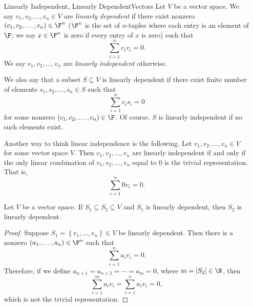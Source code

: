 \documentclass[linearalgebraI]{subfiles}
\begin{document}
    \begin{definition}{Linearly Independent, Linearly Dependent}{Vectors}
        Let $V$ be a vector space. We say $v_1,v_2,\ldots,v_n\in V$ are \emph{linearly dependent} if there exist nonzero $\left( c_1,c_2,\ldots,c_n \right)\in\F^n$ ($\F^n$ is the set of $n$-tuples where each entry is an element of $\F$; we say $x\in\F^n$ is zero if every entry of $x$ is zero) such that
        \begin{equation*}
            \sum^{n}_{i=1} c_iv_i = 0.
        \end{equation*}
        We say $v_1,v_2,\ldots,v_n$ are \emph{linearly independent} otherwise.
    \end{definition}

    \begin{remark}
        We also say that a subset $S\subseteq V$ is linearly dependent if there exist finite number of elements $s_1,s_2,\ldots,s_n\in S$ such that
        \begin{equation*}
            \sum^{n}_{i=1} c_is_i = 0
        \end{equation*}
        for some nonzero $\left( c_1,c_2,\ldots,c_n \right) \in\F$. Of course, $S$ is linearly independent if no such elements exist.
    \end{remark}

    \begin{remark}
        Another way to think linear independence is the following. Let $v_1,v_2,\ldots,v_n\in V$ for some vector space $V$. Then $v_1,v_2,\ldots,v_n$ are linearly independent if and only if the only linear combination of $v_1,v_2,\ldots,v_n$ equal to 0 is the trivial representation. That is,
        \begin{equation*}
            \sum^{n}_{i=1} 0v_i = 0.
        \end{equation*}
    \end{remark}

    \clearpage
    \begin{prop}{}
        Let $V$ be a vector space. If $S_1\subseteq S_2\subseteq V$ and $S_1$ is linearly dependent, then $S_2$ is linearly dependent.
    \end{prop}

    \begin{proof}
        Suppose $S_1 = \left\lbrace v_1, \ldots, v_n \right\rbrace \in V$ be linearly dependent. Then there is a nonzero $(a_1, \ldots, a_n)\in \F^n$ such that
        \begin{equation*}
            \sum^n_{i=1} a_iv_i = 0.
        \end{equation*}
        Therefore, if we define $a_{n+1}=a_{n+2}=\cdots=a_m=0$, where $m=\left| S_2 \right|\in\N$, then
        \begin{equation*}
            \sum^{m}_{i=1} a_iv_i = \sum^{n}_{i=1} a_iv_i = 0,
        \end{equation*}
        which is not the trivial representation.
    \end{proof}
\end{document}
